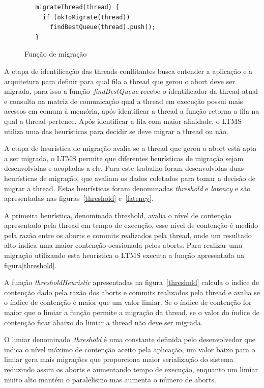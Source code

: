 \documentclass[diss,capa]{texufpel}
\begin{document}
\begin{figure}[htbp]
 \centering
 \begin{lstlisting}
   migrateThread(thread) {
     if (okToMigrate(thread))
       findBestQueue(thread).push();
   }
 \end{lstlisting}
 \caption{Função de migração}
 \label{migration}
\end{figure}

A etapa de identificação das threads conflitantes busca entender a aplicação e a arquitetura para definir para qual fila a thread que gerou o abort deve ser migrada, para isso a função~\emph{findBestQueue} recebe o identificador da thread atual e consulta na matriz de comunicação qual a thread em execução possui mais acessos em comum à memória, após identificar a thread a função retorna a fila na qual a thread pertence. Após identificar a fila com maior afinidade, o LTMS utiliza uma das heurísticas para decidir se deve migrar a thread ou não.

A etapa de heurística de migração avalia se a thread que gerou o abort está apta a ser migrada, o LTMS permite que diferentes heurísticas de migração sejam desenvolvidas e acopladas a ele.  Para este trabalho foram desenvolvidas duas heurísticas de migração, que avaliam os dados coletados para tomar a decisão de migrar a thread. Estas heurísticas foram denominadas \emph{threshold} e \emph{latency} e são apresentadas nas figuras~\ref{threshold} e~\ref{latency}.

A primeira heurística, denominada threshold, avalia o nível de contenção apresentado pela thread em tempo de execução, esse nível de contenção é medido pela razão entre os aborts e commits realizados pela thread, onde um resultado alto indica uma maior contenção ocasionada pelos aborts. Para realizar uma migração utilizando esta heurística o LTMS executa a função apresentada na figura\ref{threshold}.

A função \emph{thresholdHeuristic} apresentadas na figura~\ref{threshold} calcula o índice de contenção dado pela razão dos aborts e commits realizados pela thread e avalia se o índice de contenção é maior que um valor limiar. Se o índice de contenção for maior que o limiar a função permite a migração da thread, se o valor do índice de contenção ficar abaixo do limiar a thread não deve ser migrada.

O limiar denominado~\emph{threshold} é uma constante definida pelo desenvolvedor que indica o nível máximo de contenção aceito pela aplicação, um valor baixo para o limiar gera mais migrações que proporciona maior serialização do sistema reduzindo assim os aborts e aumentando tempo de execução, enquanto um limiar muito alto mantém o paralelismo mas aumenta o número de aborts.
\end{document}
